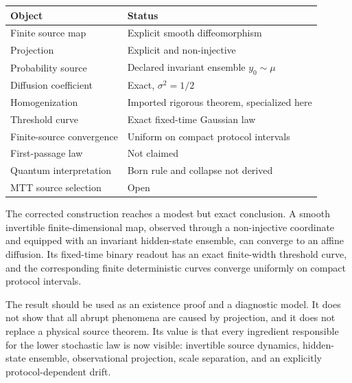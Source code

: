 \documentclass[11pt]{article}
\begin{document}
\begin{center}
\begin{tabular}{p{}p{}}
\hline
Object & Status\\
\hline
Finite source map & Explicit smooth diffeomorphism\\
Projection & Explicit and non-injective\\
Probability source & Declared invariant ensemble \(y_0\sim\mu\)\\
Diffusion coefficient & Exact, \(\sigma^2=1/2\)\\
Homogenization & Imported rigorous theorem, specialized here\\
Threshold curve & Exact fixed-time Gaussian law\\
Finite-source convergence & Uniform on compact protocol intervals\\
First-passage law & Not claimed\\
Quantum interpretation & Born rule and collapse not derived\\
MTT source selection & Open\\
\hline
\end{tabular}
\end{center}

The corrected construction reaches a modest but exact conclusion. A smooth invertible finite-dimensional map, observed through a non-injective coordinate and equipped with an invariant hidden-state ensemble, can converge to an affine diffusion. Its fixed-time binary readout has an exact finite-width threshold curve, and the corresponding finite deterministic curves converge uniformly on compact protocol intervals.

The result should be used as an existence proof and a diagnostic model. It does not show that all abrupt phenomena are caused by projection, and it does not replace a physical source theorem. Its value is that every ingredient responsible for the lower stochastic law is now visible: invertible source dynamics, hidden-state ensemble, observational projection, scale separation, and an explicitly protocol-dependent drift.



\end{document}
